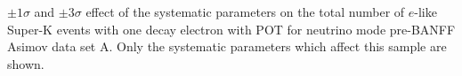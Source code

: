 \begin{table}	
	\begin{adjustbox}{width=\textwidth, totalheight=\textheight, keepaspectratio}
		
	\end{adjustbox}
	\caption
	{
		$\pm1\sigma$ and $\pm3\sigma$ effect of the systematic parameters on the total number of $e$-like Super-K events with one decay electron with \RunPeriod POT for neutrino mode pre-BANFF Asimov data set A. Only the systematic parameters which affect this sample are shown.
	}
\end{table}\clearpage